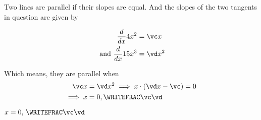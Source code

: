 \fi 

\begin{solution}[\halfpage]
	Two lines are parallel if their slopes are equal. And the slopes of the 
	two tangents in question are given by
	
	\begin{align}
		\dfrac{d}{dx}\va x^2 &= \vc x \\
		\text{ and } \dfrac{d}{dx}\vb x^3 &= \vd x^2 
	\end{align}
	
	Which means, they are parallel when 
	\begin{align}
		\vc x &= \vd x^2 \implies x\cdot (\vd x - \vc) = 0 \\
		\implies x &= 0, \WRITEFRAC\vc\vd
	\end{align}
\end{solution}

\ifprintanswers
  \begin{codex}
    $x = 0,\,\WRITEFRAC\vc\vd$
  \end{codex}
\fi
